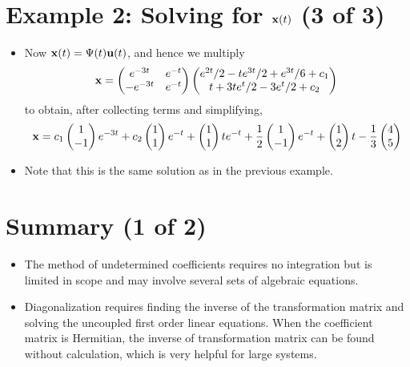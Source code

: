\documentclass[11pt,a4paper]{article}
\begin{document}
	\section*{Example 2: Solving for $\vb{x}(t)$ (3 of 3)}
	\begin{itemize}
		\item Now $\vb{x}(t) = \Psi(t)\vb{u}(t)$, and hence we multiply
		$$
		\vb{x} =
		\begin{pmatrix}
			e^{-3t} & e^{-t}\\
			-e^{-3t} & e^{-t}
		\end{pmatrix}
		\begin{pmatrix}
			e^{2t}/2-te^{3t}/2+e^{3t}/6+c_1\\
			t+3te^t/2-3e^t/2+c_2
		\end{pmatrix}
		$$
		to obtain, after collecting terms and simplifying,
		$$
		\vb{x} = c_1
		\begin{pmatrix}
			1\\
			-1
		\end{pmatrix}e^{-3t} + c_2
		\begin{pmatrix}
			1\\
			1
		\end{pmatrix}e^{-t} +
		\begin{pmatrix}
			1\\
			1
		\end{pmatrix}te^{-t} + \frac{1}{2}
		\begin{pmatrix}
			1\\
			-1
		\end{pmatrix}e^{-t} +
		\begin{pmatrix}
			1\\
			2
		\end{pmatrix}t - \frac{1}{3}
		\begin{pmatrix}
			4\\
			5
		\end{pmatrix}
		$$
		\item Note that this is the same solution as in the previous example.
	\end{itemize}
	\section*{Summary (1 of 2)}
	\begin{itemize}
		\item The method of undetermined coefficients requires no integration but is limited in scope and may involve several sets of algebraic equations.
		\item Diagonalization requires finding the inverse of the transformation matrix and solving the uncoupled first order linear equations. When the coefficient matrix is Hermitian, the inverse of transformation matrix can be found without calculation, which is very helpful for large systems.
	\end{itemize}
\end{document}
